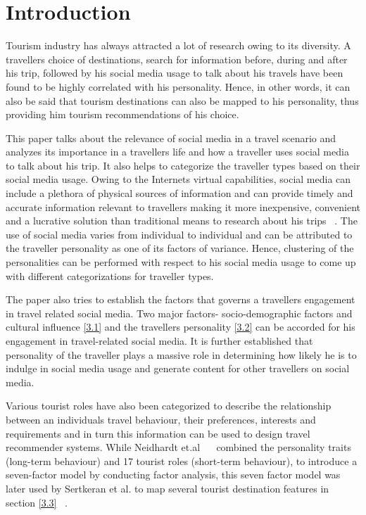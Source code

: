 \section{Introduction}
		
Tourism industry has always attracted a lot of research owing to its diversity. A traveller\textquotesingle s choice of destinations, search for information before, during and after his trip, followed by his social media usage to talk about his travels have been found to be highly correlated with his personality. Hence, in other words, it can also be said that tourism destinations can also be mapped to his personality, thus providing him tourism recommendations of his choice. 		

This paper talks about the relevance of social media in a travel scenario and analyzes its importance in a traveller\textquotesingle s life and how a traveller uses social media to talk about his trip.
It also helps to categorize the traveller types based on their social media usage. Owing to the Internet\textquotesingle s virtual capabilities, social media can include a plethora of physical sources of information and can provide timely and accurate information relevant to travellers making it more inexpensive, convenient and a lucrative solution than traditional means to research about his trips ~\cite{amaro2016travelers}. The use of social media varies from individual to individual and can be attributed to the traveller personality as one of its factors of variance. Hence, clustering of the personalities can be performed with respect to his social media usage to come up with different categorizations for traveller types.
				
The paper also tries to establish the factors that governs a traveller\textquotesingle s engagement in travel related social media. Two major factors- socio-demographic factors and cultural influence \ref{3.1} and the traveller\textquotesingle s personality \ref{3.2} can be accorded for his engagement in travel-related social media. It is further established that personality of the traveller plays a massive role in determining how likely he is to indulge in social media usage and generate content for other travellers on social media. 

Various tourist roles have also been categorized to describe the relationship between an individual\textquotesingle s travel behaviour, their preferences, interests and requirements and in turn this information can be used to design travel recommender systems. While Neidhardt et.al ~\cite{neidhardt2015picture}~\cite{neidhardt2014eliciting} combined the personality traits (long-term behaviour) and 17
tourist roles (short-term behaviour), to introduce a seven-factor
model by conducting factor analysis, this seven factor model was later used by Sertkeran et al. to map several tourist destination features in section \ref{3.3} ~\cite{sertkan2018mapping}.



